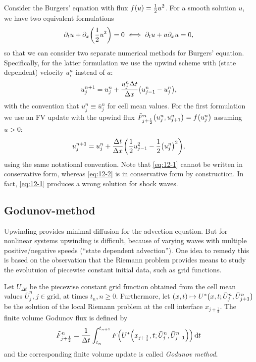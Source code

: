 \begin{example}
	Consider the Burgers' equation with flux \(f\parentheses*{u} = \frac{1}{2}u^2\).
	For a smooth solution \(u\), we have two equivalent formulations
	\[
		\partial_t u + \partial_x \parentheses*{\frac{1}{2}u^2} = 0 \iff \partial_t u + u\partial_x u = 0,
	\]
	so that we can consider two separate numerical methods for Burgers' equation.
	Specifically, for the latter formulation we use the upwind scheme with (state dependent) velocity \(u_i^n\) instead of \(a\):
	\begin{equation}\label{eq:12-1}
		u_j^{n + 1} = u_j^n + \frac{u_j^n \Delta t}{\Delta x}\parentheses*{u_{j - 1}^n - u_j^n},
	\end{equation}
	with the convention that \(u_j^n \equiv \bar{u}_j^n\) for cell mean values.
	For the first formulation we use an FV update with the upwind flux \(\tilde{F}_{j + \frac{1}{2}}^n\parentheses*{u_j^n, u_{j + 1}^n} = f\parentheses*{u_j^n}\) assuming \(u > 0\):
	\begin{equation}\label{eq:12-2}
		u_j^{n + 1} = u_j^n + \frac{\Delta t}{\Delta x}\parentheses*{\frac{1}{2}u_{j - 1}^2 - \frac{1}{2}\parentheses*{u_j^n}^2},
	\end{equation}
	using the same notational convention.
	Note that \eqref{eq:12-1} cannot be written in conservative form, whereas \eqref{eq:12-2} is in conservative form by construction.
	In fact, \eqref{eq:12-1} produces a wrong solution for shock waves.
\end{example}


\subsection{Godunov-method}

Upwinding provides minimal diffusion for the advection equation.
But for nonlinear systems upwinding is difficult, because of varying waves with multiple positive/negative speeds (``state dependent advection'').
One idea to remedy this is based on the observation that the Riemann problem provides means to study the evolutuion of piecewise constant initial data, such as grid functions.

\begin{definition}
	Let \(\bar{U}_{\Delta t}\) be the piecewise constant grid function obtained from the cell mean values \(\bar{U}_j^n, j \in \text{grid}\), at times \(t_n, n \ge 0\).
	Furthermore, let \(\parentheses*{x, t} \mapsto U^*\parentheses*{x, t; \bar{U}_j^n, \bar{U}_{j + 1}^n}\) be the solution of the local Riemann problem at the cell interface \(x_{j + \frac{1}{2}}\).
	The finite volume Godunov flux is defined by
	\[
		\tilde{F}_{j + \frac{1}{2}}^n = \frac{1}{\Delta t}\int_{t_n}^{t_{n + 1}}F\parentheses*{U^*\parentheses*{x_{j + \frac{1}{2}}, t; \bar{U}_j^n, \bar{U}_{j + 1}^n}}\d t
	\]
	and the corresponding finite volume update is called \emph{Godunov method}.
\end{definition}

